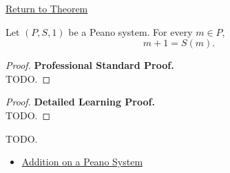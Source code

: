 \newpage
{}
\label{prf:addition-with-one}

\begin{remark*}[Return]
\hyperref[thm:addition-with-one]{Return to Theorem}
\end{remark*}

\begin{theorem*}
Let $(P,S,1)$ be a Peano system. For every $m \in P$,
\[
m+1=S(m).
\]
\end{theorem*}

\begin{proof}
\textbf{Professional Standard Proof.}~\\
TODO.
\end{proof}

\begin{proof}
\textbf{Detailed Learning Proof.}~\\
TODO.
\end{proof}

\begin{remark*}
TODO.
\end{remark*}

\begin{dependencies}
\begin{itemize}
  \item \hyperref[def:addition-on-peano-system]{Addition on a Peano System}
\end{itemize}
\end{dependencies}
